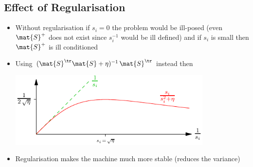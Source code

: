 \begin{slide}
\section[-2]{Effect of Regularisation}

\begin{PauseHighLight}
  \begin{itemize}
  \item Without regularisation if $s_i=0$ the problem would be ill-posed (even $\mat{S}^+$
    does not exist since $s_i^{-1}$ would be ill defined) and if $s_i$
    is small then $\mat{S}^+$ is ill conditioned\pause
  \item Using $(\mat{S}^\tr\mat{S}+\eta)^{-1}\,\mat{S}^\tr$ instead then
    \begin{center}
     \includegraphics[width=0.8\textwidth]{linregressreg} \pause
   \end{center}
   \vspace*{-2ex}
  \item Regularisation makes the machine much more stable (reduces the
    variance)\pause
  \end{itemize}
\end{PauseHighLight}

\end{slide}




